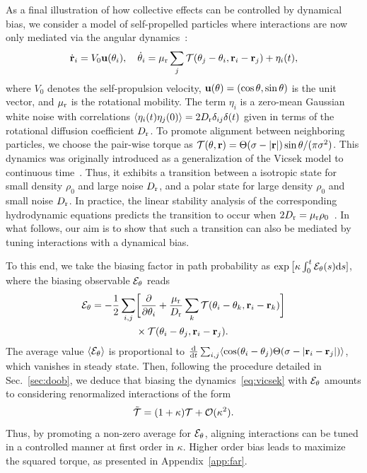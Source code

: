 \documentclass[superscriptaddress, twocolumn, prx, longbibliography, nofootinbib]{revtex4-1}
\begin{document}
As a final illustration of how collective effects can be controlled by dynamical bias, we consider a model of self-propelled particles where interactions are now only mediated via the angular dynamics~\cite{Farrell2012}:
\begin{equation}\label{eq:vicsek}
	\dot{\bf r}_i= V_0 {\bf u}(\theta_i),
	\quad
	\dot\theta_i = \mu_{\rm r} \sum_j {\cal T}(\theta_j-\theta_i, {\bf r}_i-{\bf r}_j) + \eta_i(t) ,
\end{equation}
where $V_0$ denotes the self-propulsion velocity, ${\bf u}(\theta) = (\cos\theta, \sin\theta)$ is the unit vector, and $\mu_{\rm r}$ is the rotational mobility. The term $\eta_i$ is a zero-mean Gaussian white noise with correlations $\langle\eta_i(t)\eta_j(0)\rangle = 2 D_{\rm r} \delta_{ij}\delta(t)$ given in terms of the rotational diffusion coefficient $D_{\rm r}$. To promote alignment between neighboring particles, we choose the pair-wise torque as ${\cal T}(\theta,{\bf r})=\Theta(\sigma-|{\bf r}|)\sin\theta/(\pi\sigma^2)$. This dynamics was originally introduced as a generalization of the Vicsek model to continuous time~\cite{Vicsek1995}. Thus, it exhibits a transition between a isotropic state for small density $\rho_0$ and large noise $D_{\rm r}$, and a polar state for large density $\rho_0$ and small noise $D_{\rm r}$. In practice, the linear stability analysis of the corresponding hydrodynamic equations predicts the transition to occur when $2 D_{\rm r}=\mu_{\rm r}\rho_0$~\cite{Farrell2012}. In what follows, our aim is to show that such a transition can also be mediated by tuning interactions with a dynamical bias.


To this end, we take the biasing factor in path probability as $\exp\big[\kappa \int_0^t{\cal E}_\theta(s){\rm d}s]$, where the biasing observable ${\cal E}_\theta$ reads
\begin{equation}
	\begin{aligned}\label{eq:eps_theta}
		{\cal E}_\theta = - \frac{1}{2} \sum_{i,j}& \bigg[ \frac{\partial}{\partial\theta_i} + \frac{\mu_{\rm r}}{D_{\rm r}} \sum_k {\cal T}(\theta_i-\theta_k, {\bf r}_i-{\bf r}_k) \bigg]
		\\
		&\times{\cal T}(\theta_i-\theta_j, {\bf r}_i-{\bf r}_j) .
	\end{aligned}
\end{equation}
The average value $\langle{\cal E}_\theta\rangle$ is proportional to $\frac{\rm d}{{\rm d}t}\sum_{i,j}\langle\cos(\theta_i-\theta_j)\Theta(\sigma-|{\bf r}_i-{\bf r}_j|)\rangle$, which vanishes in steady state. Then, following the procedure detailed in Sec.~\ref{sec:doob}, we deduce that biasing the dynamics~\eqref{eq:vicsek} with ${\cal E}_\theta$ amounts to considering renormalized interactions of the form 
\begin{equation}\label{eq:torque}
	\tilde{\cal T} = (1+\kappa){\cal T} + {\cal O}(\kappa^2) .
\end{equation}
Thus, by promoting a non-zero average for ${\cal E}_\theta$, aligning interactions can be tuned in a controlled manner at first order in $\kappa$. Higher order bias leads to maximize the squared torque, as presented in Appendix~\ref{app:far}.
\end{document}
